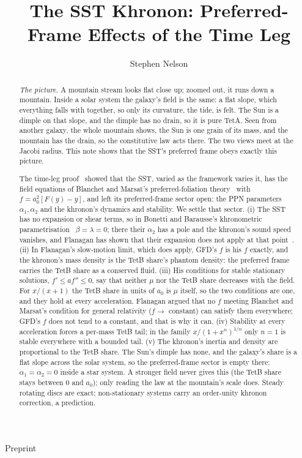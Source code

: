 \documentclass[twocolumn]{iopjournal}
\renewcommand{\articletype}[1]{%
  {\vspace*{-8mm}\noindent \Large \sf Preprint}\par
  \vspace*{6mm}\noindent{\scriptsize \sf{\bfseries \MakeUppercase{#1}}}}
\begin{document}
\articletype{Supplementary Material}

\title{The SST Khronon: Preferred-Frame Effects of the Time Leg}

\author{Stephen Nelson}



\begin{abstract}
\emph{The picture.} A mountain stream looks flat close up; zoomed out,
it runs down a mountain. Inside a solar system the galaxy's field is
the same: a flat slope, which everything falls with together, so only
its curvature, the tide, is felt. The Sun is a dimple on that slope,
and the dimple has no drain, so it is pure TetA. Seen from another
galaxy, the whole mountain shows, the Sun is one grain of its mass, and
the mountain has the drain, so the constitutive law acts there. The
two views meet at the Jacobi radius. This note shows that the SST's
preferred frame obeys exactly this picture.

The time-leg proof~\cite{NelsonTL} showed that the SST, varied as
the framework varies it, has the field equations of Blanchet and
Marsat's preferred-foliation theory~\cite{BM2011} with
$f = a_0^2[F(y) - y]$, and left its preferred-frame sector open: the
PPN parameters $\alpha_1, \alpha_2$ and the khronon's dynamics and
stability. We settle that sector. (i) The SST has no expansion or
shear terms, so in Bonetti and Barausse's khronometric
parametrisation~\cite{BB2015} $\beta = \lambda = 0$; there their
$\alpha_2$ has a pole and the khronon's sound speed vanishes, and
Flanagan has shown that their expansion does not apply at that
point~\cite{Flanagan2023}. (ii) In Flanagan's slow-motion limit,
which does apply, GFD's $f$ is his $f$ exactly, and the khronon's
mass density is the TetB share's phantom density: the preferred frame
carries the TetB share as a conserved fluid. (iii) His conditions for
stable stationary solutions, $f' \le af'' \le 0$, say that neither
$\mu$ nor the TetB share decreases with the field. For $x/(x+1)$ the
TetB share in units of $a_0$ is $\mu$ itself, so the two conditions
are one, and they hold at every acceleration. Flanagan argued that no
$f$ meeting Blanchet and Marsat's condition for general relativity
($f \to$ constant) can satisfy them everywhere; GFD's $f$ does not
tend to a constant, and that is why it can. (iv) Stability at every
acceleration forces a per-mass TetB tail; in the family
$x/(1+x^n)^{1/n}$ only $n = 1$ is stable everywhere with a bounded
tail. (v) The khronon's inertia and density are proportional to the
TetB share. The Sun's dimple has none, and the galaxy's share is a
flat slope across the solar system, so the preferred-frame sector is
empty there: $\alpha_1 = \alpha_2 = 0$ inside a star system. A
stronger field never gives this (the TetB share stays between $0$ and
$a_0$); only reading the law at the mountain's scale does. Steady rotating discs
are exact; non-stationary systems carry an order-unity khronon
correction, a prediction.
\end{abstract}
\end{document}
